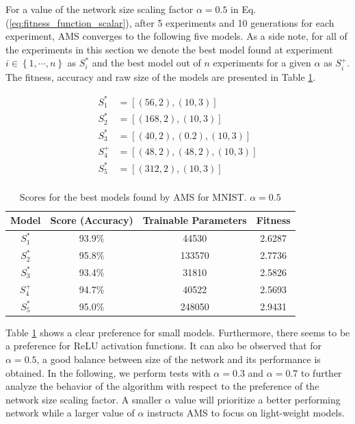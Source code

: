 \documentclass[12pt]{elsart}%
\begin{document}
For a value of the network size scaling factor $\alpha = 0.5$ in Eq. (\ref{eq:fitness_function_scalar}), after 5 experiments and 10 generations for each experiment, AMS converges to the following five models. As a side note, for all of the experiments in this section we denote the best model found at experiment $i \in \left\lbrace 1, \cdots, n \right\rbrace$ as $S_i^*$ and the best model out of $n$ experiments for a given $\alpha$ as $S_i^+$. The fitness, accuracy and raw size of the models are presented in Table \ref{table:ams_mnist_1}.

\begin{align*}
S^*_1 & = \left[ (56, 2), (10, 3) \right] \\
S^*_2 & = \left[ (168, 2), (10, 3) \right] \\
S^*_3 & = \left[ (40, 2), (0.2), (10, 3) \right] \\
S^+_4& = \left[ (48, 2), (48, 2),  (10, 3) \right] \\
S^*_5 & = \left[ (312, 2), (10, 3) \right] \\
\end{align*}



\begin{table}[!htb]
\begin{center}
\begin{tabular}{| c | c | c | c |}
\hline
Model & Score (Accuracy) & Trainable Parameters & Fitness\\
\hline
$S^*_1$ & 93.9\% & 44530 & 2.6287\\
$S^*_2$ & 95.8\% & 133570 & 2.7736\\
$S^*_3$ & 93.4\% & 31810 & 2.5826\\
$S^+_4$ & 94.7\% & 40522 & 2.5693\\
$S^*_5$ & 95.0\% & 248050 & 2.9431\\
\hline
\end{tabular}
\end{center}
\caption{Scores for the best models found by AMS for MNIST. $\alpha = 0.5$}
\label{table:ams_mnist_1}
\end{table}

Table \ref{table:ams_mnist_1} shows a clear preference for small models. Furthermore, there seems to be a preference for ReLU activation functions. It can also be observed that for $\alpha = 0.5$, a good balance between size of the network and its performance is obtained. In the following, we perform tests with $\alpha = 0.3$ and $\alpha = 0.7$ to further analyze the behavior of the algorithm with respect to the preference of the network size scaling factor. A smaller $\alpha$ value will prioritize a better performing network while a larger value of $\alpha$ instructs AMS to focus on light-weight models.
\end{document}
